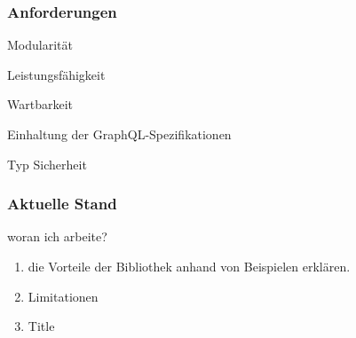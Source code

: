 \begin{frame}
    \frametitle{Anforderungen}

    \begin{alertblock}{Modularität}
    \end{alertblock}
    \begin{alertblock}{Leistungsfähigkeit}
    \end{alertblock}
    \begin{alertblock}{Wartbarkeit}
    \end{alertblock}
    \begin{alertblock}{Einhaltung der GraphQL-Spezifikationen}
    \end{alertblock}
    \begin{alertblock}{Typ Sicherheit}
    \end{alertblock}

\end{frame}








\begin{frame}{}
    \frametitle{Aktuelle Stand}

    \footnotesize

    \begin{alertblock}{woran ich arbeite?}
        \begin{enumerate}
            \item die Vorteile der Bibliothek anhand von Beispielen erklären.
            \item Limitationen
            \item Title
        \end{enumerate}
    \end{alertblock}

\end{frame}